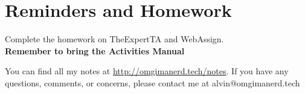 \documentclass{math}
\begin{document}
\section*{Reminders and Homework}
Complete the homework on TheExpertTA and WebAssign. \\
\textbf{Remember to bring the Activities Manual}

\begin{center}
  You can find all my notes at \url{http://omgimanerd.tech/notes}. If you have
  any questions, comments, or concerns, please contact me at
  alvin@omgimanerd.tech
\end{center}
\end{document}
